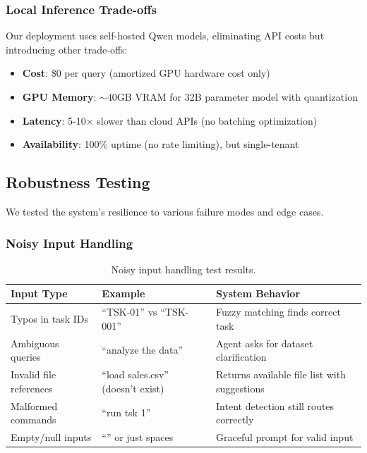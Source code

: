 \documentclass[11pt,a4paper]{article}
\begin{document}
\subsubsection{Local Inference Trade-offs}

Our deployment uses self-hosted Qwen models, eliminating API costs but introducing other trade-offs:

\begin{itemize}
    \item \textbf{Cost}: \$0 per query (amortized GPU hardware cost only)
    \item \textbf{GPU Memory}: $\sim$40GB VRAM for 32B parameter model with quantization
    \item \textbf{Latency}: 5-10$\times$ slower than cloud APIs (no batching optimization)
    \item \textbf{Availability}: 100\% uptime (no rate limiting), but single-tenant
\end{itemize}

\subsection{Robustness Testing}

We tested the system's resilience to various failure modes and edge cases.

\subsubsection{Noisy Input Handling}

\begin{table}[H]
\centering
\small
\begin{tabular}{p{4cm}p{4cm}p{5cm}}
\toprule
\textbf{Input Type} & \textbf{Example} & \textbf{System Behavior} \\
\midrule
Typos in task IDs & ``TSK-01'' vs ``TSK-001'' & Fuzzy matching finds correct task \\
Ambiguous queries & ``analyze the data'' & Agent asks for dataset clarification \\
Invalid file references & ``load sales.csv'' (doesn't exist) & Returns available file list with suggestions \\
Malformed commands & ``run tsk 1'' & Intent detection still routes correctly \\
Empty/null inputs & ``'' or just spaces & Graceful prompt for valid input \\
\bottomrule
\end{tabular}
\caption{Noisy input handling test results.}
\end{table}
\end{document}
